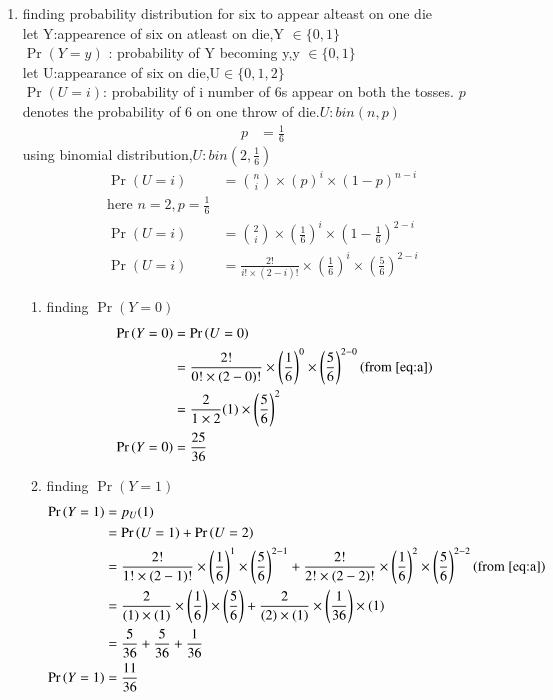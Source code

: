 \documentclass[journal,12pt,onecolumn]{IEEEtran}
\providecommand{\pr}[1]{\ensuremath{\Pr\left(#1\right)}}
\providecommand{\brak}[1]{\ensuremath{\left(#1\right)}}
\theoremstyle{remark}
\begin{document}
\begin{enumerate}
\begin{enumerate}
\end{enumerate}
\item finding probability distribution for six to appear alteast on one die\\
let Y:appearence of six on atleast on die,Y $\in \{ 0,1\}$ \\
$\pr{Y=y}$ : probability of Y becoming y,y $\in \{ 0,1\}$\\
let U:appearance of six on die,U$\in \{0,1,2\}$\\
$\pr{U=i}$: probability of i number of 6s appear on both the tosses.
$p$ denotes the probability of 6 on one throw of die.$U:bin(n,p)$
\begin{align}
 p&=\frac{1}{6} 
\end{align}
using binomial distribution,$U:bin(2,\frac{1}{6})$
\begin{align}
\pr{U=i}&={n \choose i}\times(p)^i\times(1-p)^{n-i}\\
\text{here } n=2,p=\frac{1}{6} \\
\pr{U=i}&={2 \choose i}\times\brak{\frac{1}{6}}^i\times\brak{1-\frac{1}{6}}^{2-i}\\
\pr{U=i}&=\frac{2!}{i!\times(2-i)!}\times\brak{\frac{1}{6}}^i\times\brak{\frac{5}{6}}^{2-i} \label{eq:a}
\end{align} 
\begin{enumerate}
\item finding $\pr{Y=0}$
\begin{align}
\pr{Y=0}&=\pr{U=0}\\
&=\frac{2!}{0!\times(2-0)!}\times\brak{\frac{1}{6}}^0\times\brak{\frac{5}{6}}^{2-0} (\text{from } \eqref{eq:a})\\
&=\frac{2}{1\times2}(1)\times\brak{\frac{5}{6}}^{2}\\
\pr{Y=0}&=\frac{25}{36}
\end{align}
\item finding $\pr{Y=1}$
\begin{align}
\pr{Y=1}&=p_U(1)\\
&=\pr{U=1}+\pr{U=2}\\
&=\frac{2!}{1!\times(2-1)!}\times\brak{\frac{1}{6}}^1\times\brak{\frac{5}{6}}^{2-1}+\frac{2!}{2!\times(2-2)!}\times\brak{\frac{1}{6}}^2\times\brak{\frac{5}{6}}^{2-2} (\text{from }\eqref{eq:a})\\
&=\frac{2}{(1)\times(1)}\times\brak{\frac{1}{6}}\times\brak{\frac{5}{6}}+\frac{2}{(2)\times(1)}\times\brak{\frac{1}{36}}\times(1)  \\
&=\frac{5}{36}+\frac{5}{36}+\frac{1}{36}\\
\pr{Y=1}&=\frac{11}{36}
\end{align}
\end{enumerate}
\end{enumerate}
\end{document}
